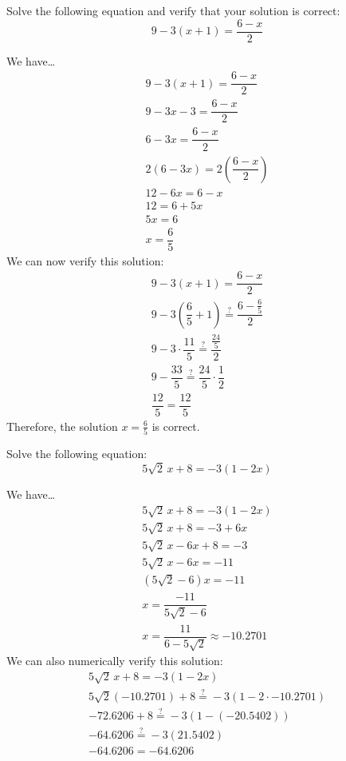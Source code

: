 \documentclass[11pt,letterpaper]{article}
\begin{document}
\newpage



 Solve the following equation and verify that your solution is correct:
	\[
	9 - 3(x + 1)= \dfrac{6 - x}{2}
	\] \pspace

\sol We have\dots
	\[
	\begin{gathered}
	9 - 3(x + 1)= \dfrac{6 - x}{2} \\[0.3cm]
	9 - 3x - 3= \dfrac{6 - x}{2} \\[0.3cm]
	6 - 3x= \dfrac{6 - x}{2} \\[0.3cm]
	2(6 - 3x)= 2 \left( \dfrac{6 - x}{2} \right) \\[0.3cm]
	12 - 6x= 6 - x \\[0.3cm]
	12= 6 + 5x \\[0.3cm]
	5x= 6 \\[0.3cm]
	x= \dfrac{6}{5}
	\end{gathered}
	\] \pspace
We can now verify this solution:
	\[
	\begin{gathered}
	9 - 3(x + 1)= \dfrac{6 - x}{2} \\
	9 - 3 \left( \dfrac{6}{5} + 1 \right) \stackrel{?}{=} \dfrac{6 - \frac{6}{5}}{2} \\[0.3cm]
	9 - 3 \cdot \dfrac{11}{5} \stackrel{?}{=} \dfrac{\frac{24}{5}}{2} \\[0.3cm]
	9 - \dfrac{33}{5} \stackrel{?}{=} \dfrac{24}{5} \cdot \dfrac{1}{2} \\[0.3cm]
	\dfrac{12}{5}= \dfrac{12}{5}
	\end{gathered}
	\]
Therefore, the solution $x= \frac{6}{5}$ is correct. 



\newpage



 Solve the following equation:
	\[
	5\sqrt{2}\, x + 8= -3(1 - 2x)
	\] \pspace

\sol We have\dots
	\[
	\begin{gathered}
	5\sqrt{2}\, x + 8= -3(1 - 2x) \\[0.3cm]
	5\sqrt{2}\,x + 8= -3 + 6x \\[0.3cm]
	5\sqrt{2}\,x - 6x + 8= -3 \\[0.3cm]
	5\sqrt{2}\,x - 6x= -11 \\[0.3cm]
	(5\sqrt{2} - 6)x= -11 \\[0.3cm]
	x= \dfrac{-11}{5 \sqrt{2} - 6} \\[0.3cm]
	x= \dfrac{11}{6 - 5\sqrt{2}} \approx -10.2701
	\end{gathered}
	\] \pspace
We can also numerically verify this solution:
	\[
	\begin{gathered}
	5\sqrt{2}\, x + 8= -3(1 - 2x) \\[0.3cm]
	5\sqrt{2} (-10.2701) + 8 \stackrel{?}{=} -3( 1 - 2 \cdot -10.2701) \\[0.3cm]
	-72.6206 + 8 \stackrel{?}{=} -3 (1 - (-20.5402)) \\[0.3cm]
	-64.6206 \stackrel{?}{=} -3(21.5402) \\[0.3cm]
	-64.6206= -64.6206
	\end{gathered}
	\] \pspace
\end{document}
